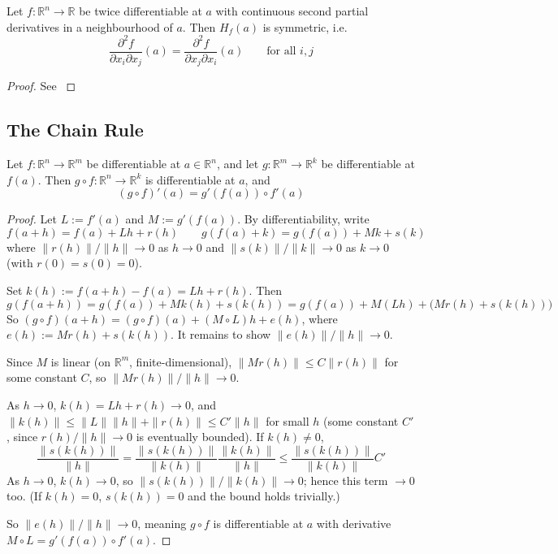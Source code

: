 		\begin{theorem}
			\label{thm:hessian-symmetric}
			Let $f:\mathbb{R}^n\to\mathbb{R}$ be twice differentiable at $a$ with continuous second partial derivatives in a neighbourhood of $a$. Then $H_f(a)$ is symmetric, i.e.\
			\[
				\frac{\partial^2 f}{\partial x_i\partial x_j}(a) = \frac{\partial^2 f}{\partial x_j\partial x_i}(a) \qquad \text{for all } i,j
			\]
		\end{theorem}
		
		\begin{proof}
			See \cite[Chapter 9]{Rudin1976}
		\end{proof}
		
	\subsection{The Chain Rule}
	\label{subsec:chain-rule}
		
		\begin{theorem}
			\label{thm:chain-rule}
			Let $f:\mathbb{R}^n\to\mathbb{R}^m$ be differentiable at $a\in\mathbb{R}^n$, and let $g:\mathbb{R}^m\to\mathbb{R}^k$ be differentiable at $f(a)$. Then $g\circ f:\mathbb{R}^n\to\mathbb{R}^k$ is differentiable at $a$, and
			\[
				(g\circ f)'(a) = g'(f(a)) \circ f'(a)
			\]
		\end{theorem}
		
		\begin{proof}
			Let $L:=f'(a)$ and $M:=g'(f(a))$. By differentiability, write
			\[
				f(a+h) = f(a) + Lh + r(h) \qquad g(f(a)+k) = g(f(a)) + Mk + s(k)
			\]
			where $\|r(h)\|/\|h\|\to0$ as $h\to0$ and $\|s(k)\|/\|k\|\to0$ as $k\to0$ (with $r(0)=s(0)=0$).
			
			Set $k(h) := f(a+h)-f(a) = Lh+r(h)$. Then
			\[
				g(f(a+h)) = g(f(a)) + Mk(h) + s(k(h)) = g(f(a)) + M(Lh) + \big(Mr(h)+s(k(h))\big)
			\]
			So $(g\circ f)(a+h) = (g\circ f)(a) + (M\circ L)h + e(h)$, where $e(h):=Mr(h)+s(k(h))$. It remains to show $\|e(h)\|/\|h\|\to0$.
			
			Since $M$ is linear (on $\mathbb{R}^m$, finite-dimensional), $\|Mr(h)\|\le C\|r(h)\|$ for some constant $C$, so $\|Mr(h)\|/\|h\|\to0$.
			
			As $h\to0$, $k(h)=Lh+r(h)\to0$, and $\|k(h)\|\le\|L\|\|h\|+\|r(h)\|\le C'\|h\|$ for small $h$ (some constant $C'$, since $r(h)/\|h\|\to0$ is eventually bounded). If $k(h)\neq0$,
			\[
				\frac{\|s(k(h))\|}{\|h\|} = \frac{\|s(k(h))\|}{\|k(h)\|}\frac{\|k(h)\|}{\|h\|} \le \frac{\|s(k(h))\|}{\|k(h)\|} C'
			\]
			As $h\to0$, $k(h)\to0$, so $\|s(k(h))\|/\|k(h)\|\to0$; hence this term $\to0$ too. (If $k(h)=0$, $s(k(h))=0$ and the bound holds trivially.)
			
			So $\|e(h)\|/\|h\|\to0$, meaning $g\circ f$ is differentiable at $a$ with derivative $M\circ L = g'(f(a))\circ f'(a)$.
		\end{proof}
		
